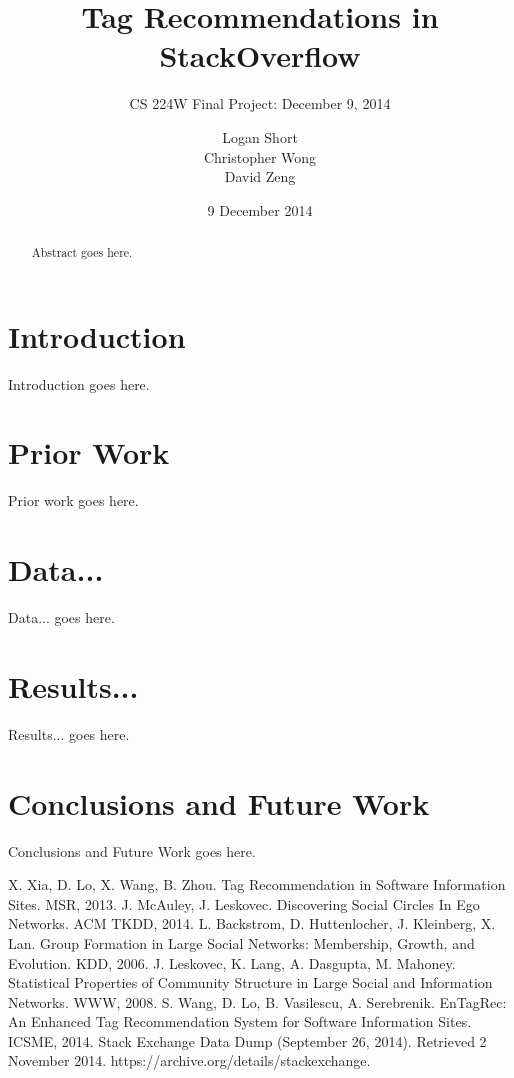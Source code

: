 \documentclass{acm_proc_article-sp}
\begin{document}
\setlength{\parindent}{15pt}

\title{Tag Recommendations in StackOverflow}
\subtitle{CS 224W Final Project: December 9, 2014}

\author{
  \alignauthor
  Logan Short\\
  \alignauthor
  Christopher Wong\\
  \alignauthor
  David Zeng\\
}

\date{9 December 2014}

\maketitle

\begin{abstract}
Abstract goes here.
\end{abstract}

\section{Introduction}
Introduction goes here.

\section{Prior Work}
Prior work goes here.

\section{Data...}
Data... goes here.

\section{Results...}
Results... goes here.

\section{Conclusions and Future Work}
Conclusions and Future Work goes here.

\begin{thebibliography}{1}
 X. Xia, D. Lo, X. Wang, B. Zhou. Tag Recommendation in Software Information Sites. MSR, 2013.
 J. McAuley, J. Leskovec. Discovering Social Circles In Ego Networks. ACM TKDD, 2014.
 L. Backstrom, D. Huttenlocher, J. Kleinberg, X. Lan. Group Formation in Large Social Networks: Membership, Growth, and Evolution. KDD, 2006.
 J. Leskovec, K. Lang, A. Dasgupta, M. Mahoney. Statistical Properties of Community Structure in Large Social and Information Networks. WWW, 2008.
 S. Wang, D. Lo, B. Vasilescu, A. Serebrenik. EnTagRec: An Enhanced Tag Recommendation System for Software Information Sites. ICSME, 2014.
 Stack Exchange Data Dump (September 26, 2014). Retrieved 2 November 2014. https://archive.org/details/stackexchange.
\end{thebibliography}

\end{document}
